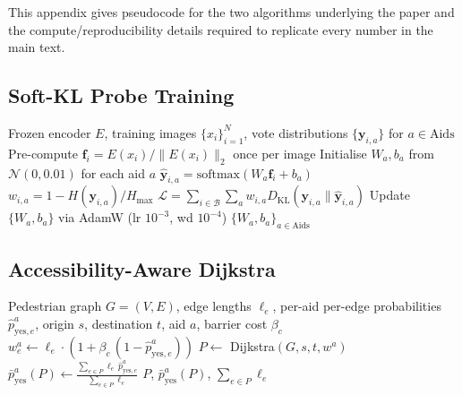 \documentclass{article}
\newcommand{\kl}{D_{\mathrm{KL}}}
\newcommand{\hmax}{H_{\max}}
\begin{document}
This appendix gives pseudocode for the two algorithms underlying the paper and the compute/reproducibility details required to replicate every number in the main text.

\subsection{Soft-KL Probe Training}

\begin{algorithm}[!ht]
\caption{Soft-KL training of a per-aid linear probe}
\label{alg:softkl}
\begin{algorithmic}[1]
\REQUIRE Frozen encoder $E$, training images $\{x_i\}_{i=1}^N$, vote distributions $\{\mathbf{y}_{i,a}\}$ for $a \in \mathrm{Aids}$
\STATE Pre-compute $\mathbf{f}_i = E(x_i)/\|E(x_i)\|_2$ once per image
\STATE Initialise $W_a, b_a$ from $\mathcal{N}(0, 0.01)$ for each aid $a$
      \STATE $\hat{\mathbf{y}}_{i,a} = \mathrm{softmax}(W_a \mathbf{f}_i + b_a)$
      \STATE $w_{i,a} = 1 - H(\mathbf{y}_{i,a})/\hmax$
      \STATE $\mathcal{L} = \sum_{i \in \mathcal{B}}\sum_a w_{i,a} \kl(\mathbf{y}_{i,a}\|\hat{\mathbf{y}}_{i,a})$
      \STATE Update $\{W_a, b_a\}$ via AdamW (lr $10^{-3}$, wd $10^{-4}$)
   \ENDFOR
\ENDFOR
\RETURN $\{W_a, b_a\}_{a \in \mathrm{Aids}}$
\end{algorithmic}
\end{algorithm}

\subsection{Accessibility-Aware Dijkstra}

\begin{algorithm}[!ht]
\caption{Per-aid accessibility-aware shortest path}
\label{alg:dijkstra}
\begin{algorithmic}[1]
\REQUIRE Pedestrian graph $G=(V,E)$, edge lengths $\ell_e$, per-aid per-edge probabilities $\hat{p}^a_{\mathrm{yes},e}$, origin $s$, destination $t$, aid $a$, barrier cost $\beta_c$
   \STATE $w_e^a \gets \ell_e \cdot (1 + \beta_c \,(1 - \hat{p}^a_{\mathrm{yes},e}))$
\ENDFOR
\STATE $P \gets$ Dijkstra$(G, s, t, w^a)$
\STATE $\bar{p}^a_{\mathrm{yes}}(P) \gets \frac{\sum_{e \in P} \ell_e \,\hat{p}^a_{\mathrm{yes},e}}{\sum_{e \in P} \ell_e}$
\RETURN $P$, $\bar{p}^a_{\mathrm{yes}}(P)$, $\sum_{e \in P} \ell_e$
\end{algorithmic}
\end{algorithm}
\end{document}
